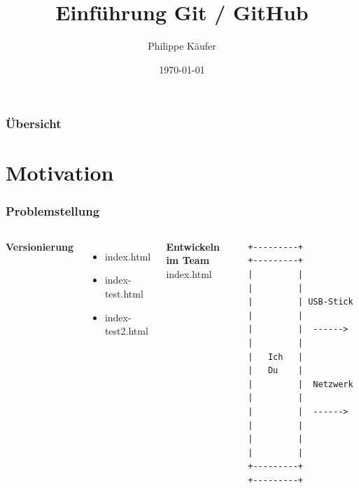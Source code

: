 \documentclass{beamer}
\title[Einführung Git / GitHub ]{Einführung Git / GitHub} %
\author{Philippe Käufer}
\institute[HACK TO THE FUTURE] %
{
\textit{BY Philippe Käufer (Lizenz: CC BY-NC-SA 3.0)} \\
HACK TO THE FUTURE \\ %
\medskip
}
\date{\today} %
\begin{document}
\begin{frame}
\titlepage %
\end{frame}

\begin{frame}
\frametitle{Übersicht} %
\tableofcontents %
\end{frame}


\section{Motivation}

\begin{frame}[fragile]
\frametitle{Problemstellung}
\begin{columns}
    \textbf{Versionierung}\smallskip
    \begin{itemize}
    \item index.html
    \pause \item index-test.html
    \pause \item index-test2.html 
    \end{itemize}

    \pause \textbf{Entwickeln im Team}\bigskip
    \\index.html
    
	\fontsize{8pt}{1.2}\selectfont
    \begin{verbatim}
+---------+           +---------+
|         |           |         |
|         | USB-Stick |         |
|         |  ------>  |         |
|   Ich   |           |   Du    |
|         |  Netzwerk |         |
|         |  ------>  |         |
|         |           |         |
+---------+           +---------+
    \end{verbatim}

  \end{columns}
\end{frame}
\end{document}
